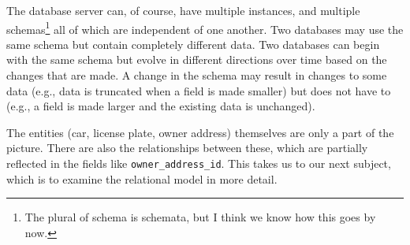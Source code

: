 The database server can, of course, have multiple instances, and multiple schemas\footnote{The plural of schema is schemata, but I think we know how this goes by now.} all of which are independent of one another. Two databases may use the same schema but contain completely different data. Two databases can begin with the same schema but evolve in different directions over time based on the changes that are made. A change in the schema may result in changes to some data (e.g., data is truncated when a field is made smaller) but does not have to (e.g., a field is made larger and the existing data is unchanged).

The entities (car, license plate, owner address) themselves are only a part of the picture. There are also the relationships between these, which are partially reflected in the fields like \texttt{owner\_address\_id}. This takes us to our next subject, which is to examine the relational model in more detail.







